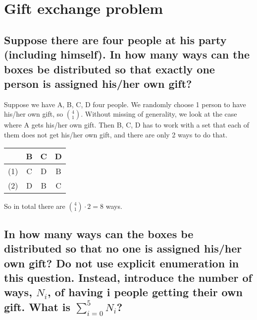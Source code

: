 \documentclass{article}
\begin{document}
\section{Gift exchange problem}

\subsection{Suppose there are four people at his party (including himself). In how many ways can the boxes
be distributed so that exactly one person is assigned his/her own gift?}
Suppose we have A, B, C, D four people. We randomly choose 1 person to have his/her own gift, so \({4 \choose 1}\). 
Without missing of generality, we look at the case where A gets his/her own gift. Then B, C, D has to work with a set that each of them does not get his/her own gift, and there are only 2 ways to do that.
\begin{center}
\begin{tabular}{ |c|c|c|c| } 
 \hline
 & B & C & D \\ 
 \hline
 (1) & C & D & B \\ 
 (2) & D & B & C \\ 
 \hline
\end{tabular}
\end{center}
So in total there are \( {4 \choose 1} \cdot 2 = 8\) ways.

\subsection{In how many ways can the boxes be distributed so that no one is assigned his/her own gift? Do not use explicit enumeration in this question. Instead, introduce the number of ways, \(N_i\), of having i people getting their own gift. What is \( \sum_{i=0}^{5} N_i \)?}
\end{document}
